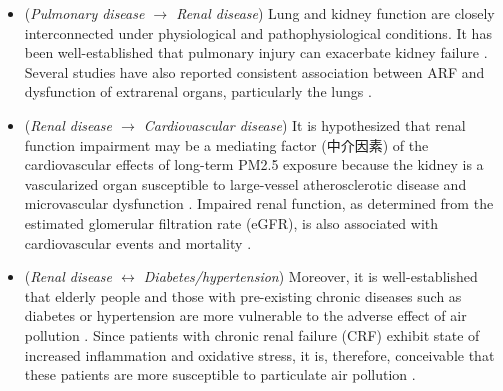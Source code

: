 \documentclass[11pt]{article}
\begin{document}
\begin{itemize}
    \item (\textit{Pulmonary disease $\rightarrow$ Renal disease}) Lung and kidney function are closely interconnected under physiological and pathophysiological conditions. It has been well-established that pulmonary injury can exacerbate kidney failure \citep{pierson2006respiratory}. Several studies have also reported consistent association between ARF and dysfunction of extrarenal organs, particularly the lungs \citep{hoke2007acute, pierson2006respiratory}.
    \item (\textit{Renal disease $\rightarrow$ Cardiovascular disease}) It is hypothesized that renal function impairment may be a mediating factor (中介因素) of the cardiovascular effects of long-term PM2.5 exposure because the kidney is a vascularized organ susceptible to large-vessel atherosclerotic disease and microvascular dysfunction \citep{lue2013residential}. Impaired renal function, as determined from the estimated glomerular filtration rate (eGFR), is also associated with cardiovascular events and mortality \citep{fox2012associations, go2004chronic, sarnak2003kidney}. 
    \item (\textit{Renal disease $\leftrightarrow$ Diabetes/hypertension}) Moreover, it is well-established that elderly people and those with pre-existing chronic diseases such as diabetes or hypertension are more vulnerable to the adverse effect of air pollution \citep{brook2010particulate}. Since patients with chronic renal failure (CRF) exhibit state of increased inflammation and oxidative stress, it is, therefore, conceivable that these patients are more susceptible to particulate air pollution \citep{laden2011air, huang2014impact}.
\end{itemize}
\end{document}

